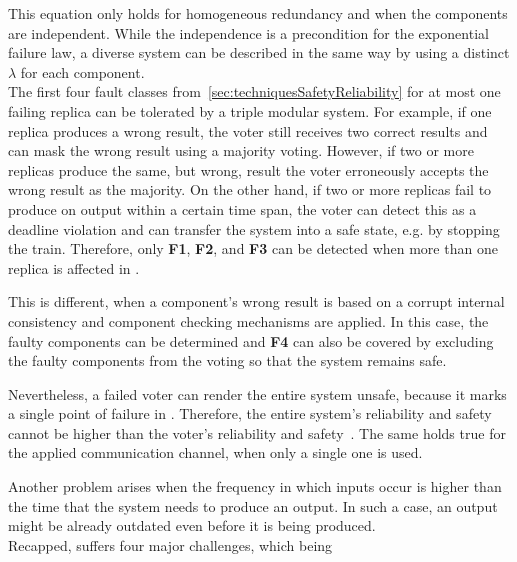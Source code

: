 This equation only holds for homogeneous redundancy and when the components are independent.
While the independence is a precondition for the exponential failure law, a diverse system can be described in the same way by using a distinct $\lambda$ for each component.
\\

The first four fault classes from~\autoref{sec:techniquesSafetyReliability} for at most one failing replica can be tolerated by a triple modular system.
For example, if one replica produces a wrong result, the voter still receives two correct results and can mask the wrong result using a majority voting.
However, if two or more replicas produce the same, but wrong, result the voter erroneously accepts the wrong result as the majority.
On the other hand, if two or more replicas fail to produce on output within a certain time span, the voter can detect this as a deadline violation and can transfer the system into a safe state, e.g. by stopping the train.
Therefore, only \textbf{F1}, \textbf{F2}, and \textbf{F3} can be detected when more than one replica is affected in .

This is different, when a component's wrong result is based on a corrupt internal consistency and component checking mechanisms are applied.
In this case, the faulty components can be determined and \textbf{F4} can also be covered by excluding the faulty components from the voting so that the system remains safe.

Nevertheless, a failed voter can render the entire system unsafe, because it marks a single point of failure in .
Therefore, the entire system's reliability and safety cannot be higher than the voter's reliability and safety~\cite{ArifeenFaultTolerantTMR}.
The same holds true for the applied communication channel, when only a single one is used.

Another problem arises when the frequency in which inputs occur is higher than the time that the system needs to produce an output.
In such a case, an output might be already outdated even before it is being produced.
\\

Recapped,  suffers four major challenges, which being

